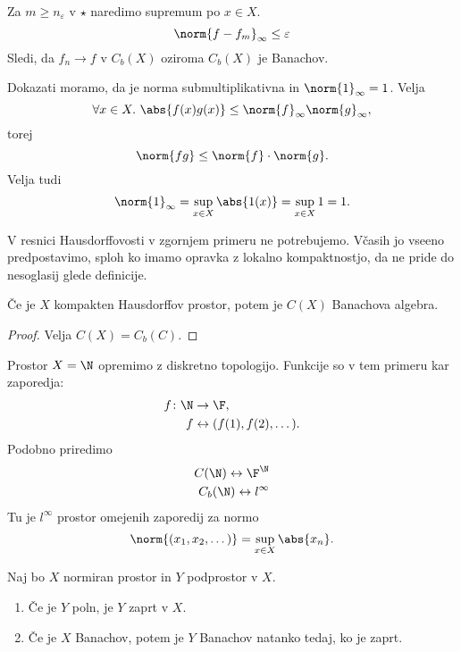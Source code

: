 \begin{primer}
    Za $m \ge n_\varepsilon$ v $\star$ %
    naredimo supremum po $x \in X$.
    \[
        \norm{f - f_m}_\infty \le \varepsilon
    \]
    Sledi, da $f_n \to f$ v $C_b(X)$ oziroma $C_b(X)$ 
    je Banachov.

    Dokazati moramo, da je norma submultiplikativna in 
    $\norm{1}_\infty = 1$.
    Velja
    \[
        \forall x \in X.~ \abs{f(x)g(x)} \le \norm{f}_\infty\norm{g}_\infty,
    \]
    torej
    \[
        \norm{fg} \le \norm{f} \cdot \norm{g}.
    \]
    Velja tudi
    \[
        \norm{1}_\infty = \sup_{x \in X} \abs{1(x)} = \sup_{x \in X} 1 = 1.
    \]
\end{primer}

\begin{opomba}
    V resnici Hausdorffovosti v zgornjem primeru ne potrebujemo. Včasih jo 
    vseeno predpostavimo, sploh ko imamo opravka z lokalno kompaktnostjo, da 
    ne pride do nesoglasij glede definicije.
\end{opomba}

\begin{posledica}
    Če je $X$ kompakten Hausdorffov prostor, potem je $C(X)$ 
    Banachova algebra.
\end{posledica}

\begin{proof}
    Velja $C(X) = C_b(C)$.
\end{proof}

\begin{primer}
    Prostor $X = \N$ opremimo z diskretno topologijo. Funkcije so 
    v tem primeru kar zaporedja:
    \begin{align*}
        f \colon \N &\to \F, \\
        f &\leftrightarrow (f(1), f(2), \dots).
    \end{align*}
    Podobno priredimo
    \begin{align*}
        C(\N) \leftrightarrow \F^{\N} \\
        C_b(\N) \leftrightarrow l^\infty
    \end{align*}
    Tu je $l^\infty$ prostor omejenih zaporedij za normo
    \[
        \norm{(x_1, x_2, \dots)} = \sup_{x \in X}\abs{x_n}.
    \] 
\end{primer}

\begin{trditev}
    Naj bo $X$ normiran prostor in $Y$ podprostor v $X$. 
    \begin{enumerate}
        \item Če je $Y$ poln, je $Y$ zaprt v $X$.
        \item Če je $X$ Banachov, potem je $Y$ Banachov
        natanko tedaj, ko je zaprt.
    \end{enumerate}
\end{trditev}

